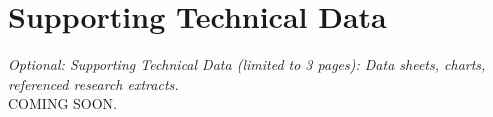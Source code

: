 \documentclass[11pt,english,letterpaper]{scrartcl}
\begin{document}
%
%
%
%
%
%	
%
%	
%
%	
%
%	
%

\section{Supporting Technical Data}

\textit{Optional: Supporting Technical Data (limited to 3 pages): Data sheets, charts, referenced research extracts.} \\

COMING SOON.

	


	
\end{document}
